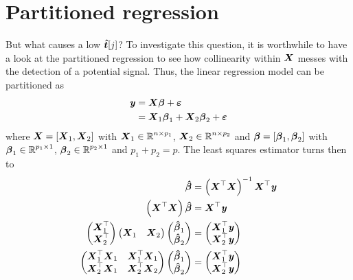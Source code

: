 \documentclass[11pt,a4paper,twoside]{book}\usepackage[]{graphicx}\usepackage[]{xcolor}
\begin{document}
\section{Partitioned regression}

But what causes a low $\hbt[j]$? To investigate this question, it is worthwhile to have a look at the partitioned regression to see how collinearity within $\X$ messes with the detection of a potential signal. Thus, the linear regression model can be partitioned as
\begin{align*}
\y&=\X\bbeta+\bvarepsilon\\
&=\X_1\bbeta_1+\X_2\bbeta_2+\bvarepsilon
\end{align*}
where $\X=\left[\X_1,\X_2\right]$ with $\X_1\in \R^{n\times p_1}$, $\X_2\in \R^{n\times p_2}$ and $\bbeta=\left[\bbeta_1,\bbeta_2\right]$ with $\bbeta_1\in \R^{p_1\times 1}$, $\bbeta_2\in \R^{p_2\times 1}$ and $p_1+p_2=p$. The least squares estimator turns then to
\begin{align*}
\hbbeta&=\left(\X^\top\X\right)^{-1}\X^\top\y\\
\left(\X^\top\X\right)\hbbeta&=\X^\top\y\\
\begin{pmatrix}\X_1^\top\\ \X_2^\top\end{pmatrix} \begin{pmatrix}\X_1&\X_2\end{pmatrix} \begin{pmatrix}\hbbeta_1\\\hbbeta_2\end{pmatrix}&=\begin{pmatrix}\X_1^\top \y\\\X_2^\top\y\end{pmatrix}\\
\begin{pmatrix}
\X_1^\top \X_1 & \X_1^\top \X_1\\
\X_2^\top \X_1 & \X_2^\top \X_2
\end{pmatrix}
\begin{pmatrix}\hbbeta_1\\ \hbbeta_2\end{pmatrix} &= \begin{pmatrix}\X_1^\top \y \\ \X_2^\top \y\end{pmatrix}
\end{align*}
\end{document}

